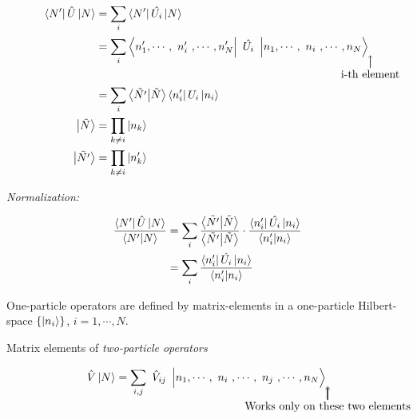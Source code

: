 \begin{align}
	\bra{N'} \hat{U}\ket{N} &= \sum_i  \bra{N'} \hat{U_i}\ket{N} \nonumber \\
	&= \sum_i \bra{n'_1, \cdots, \tikzmark{node1}{n'_i}, \cdots, n'_N}\tikzmark{node2}{\hat{U_i}} \ket{n_1, \cdots, \tikzmark{node3}{n_i},\cdots, n_N} \nonumber
	\begin{tikzpicture}[overlay, remember picture,node distance =1.5cm]
		\draw[->,black] (node2) .. controls +(down:1.2cm) and +(right:0cm) .. node[below] {i-th element} (node3.south);
	\end{tikzpicture}\\
	\nonumber \\
	&= \sum_i \bra{\tilde{N'}}\ket{\tilde{N}} \bra{n'_i} U_i \ket{n_i}\\
	\ket{\tilde{N}} &= \prod_{k \neq i} \ket{n_k} \nonumber \\
	\ket{\tilde{N'}} &= \prod_{k \neq i} \ket{n'_k} \nonumber
\end{align}

\noindent \emph{Normalization:}

\begin{align}
	\frac{\bra{N'} \hat{U} \ket{N}}{\braket{N'}{N}} &= \sum_i \frac{\bra{\tilde{N'}} \ket{\tilde{N}}}{\braket{\tilde{N'}}{\tilde{N}}} \cdot \frac{\bra{n'_i} \hat{U_i} \ket{n_i}}{{\braket{n'_i}{n_i}}} \nonumber \\
	&= \sum_i \frac{\bra{n'_i} \hat{U_i} \ket{n_i}}{\braket{n'_i}{n_i}}
\end{align}


\begin{tcolorbox}
	One-particle operators are defined by matrix-elements in a one-particle Hilbert-space $\{\ket{n_i}\}$, ${i=1,\cdots,N}$.
\end{tcolorbox}

\noindent Matrix elements of \emph{two-particle operators}

\begin{equation}
	\hat{V} \ket{N}= \sum_{i,j} \tikzmark{node1}{\hat{V}_{ij}} \ket{n_1, \cdots , \tikzmark{node2}{n_i}, \cdots, \tikzmark{node3}{n_j}, \cdots, n_N}
	\begin{tikzpicture}[overlay, remember picture,node distance =1.5cm]
		\draw[->,black] (node1) .. controls +(down:1.2cm) and +(right:0cm) .. node[below] {} (node2.south);
		\draw[->,black] (node1) .. controls +(down:1.2cm) and +(right:0cm) .. node[below] {Works only on these two elements} (node3.south);
	\end{tikzpicture}\\
\end{equation}\\
\linebreak


